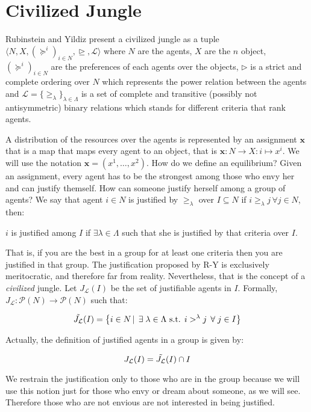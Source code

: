 \section{Civilized Jungle}

Rubinstein and Yildiz \cite{RY} present a civilized jungle as a tuple $\langle N,X,(\succeq^i)_{i\in N}, \trianglerighteq, \mathcal{L}\rangle$ where $N$ are the agents, $X$ are the $n$ object, $(\succeq^i)_{i\in N}$ are the preferences of each agents over the objects, $\triangleright$ is a strict and complete ordering over $N$ which represents the power relation between the agents and $\mathcal{L}=\{\geq_{\lambda}\}_{\lambda\in\Lambda}$ is a set of complete and transitive (possibly not antisymmetric) binary relations which stands for different criteria that rank agents. 

A distribution of the resources over the agents is represented by an assignment $\textbf{x}$ that is a map that maps every agent to an object, that is $\textbf{x}:N\rightarrow X:i\mapsto x^i$. We will use the notation $\textbf{x}=(x^1,\dots,x^2)$. How do we define an equilibrium? Given an assignment, every agent has to be the strongest among those who envy her and can justify themself. How can someone justify herself among a group of agents? We say that agent $i\in N$ is justified by $\geq_{\lambda}$ over $I\subseteq N$ if $i\geq_{\lambda} j\,\forall j\in N$, then:
\begin{center}
$i$ is justified among $I$ if $\exists\lambda\in\Lambda$ such that she is justified by that criteria over $I$.
\end{center}

That is, if you are the best in a group for at least one criteria then you are justified in that group. The justification proposed by R-Y is exclusively meritocratic, and therefore far from reality. Nevertheless, that is the concept of a \textit{civilized} jungle. 
Let $J_{\mathcal{L}}(I)$ be the set of justifiable agents in $I$. Formally, $J_{\mathcal{L}}:\mathcal{P}(N)\rightarrow\mathcal{P}(N)$ such that:

\[\Tilde{J_{\mathcal{L}}}(I)=\left\{i\in N\,|\, \exists\lambda\in\Lambda\text{ s.t. }i>^{\lambda}j\,\forall j\in I\right\}\]

Actually, the definition of justified agents in a group is given by:

\[J_{\mathcal{L}}(I)=\Tilde{J_{\mathcal{L}}}(I)\cap I\]

We restrain the justification only to those who are in the group because we will use this notion just for those who envy or dream about someone, as we will see. Therefore those who are not envious are not interested in being justified. 

